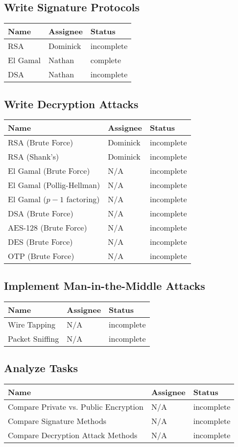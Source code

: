 \documentclass[12pt]{report}
\begin{document}
\subsection{Write Signature Protocols}
\begin{tabular}{l|l|l}
    Name & Assignee & Status \\ \hline
    RSA & Dominick & incomplete \\
    El Gamal & Nathan & complete \\
    DSA & Nathan & incomplete	 
\end{tabular}

\subsection{Write Decryption Attacks}
\begin{tabular}{l|l|l}
    Name & Assignee & Status \\ \hline
    RSA (Brute Force) & Dominick & incomplete \\
    RSA (Shank's) & Dominick & incomplete \\
    El Gamal (Brute Force) & N/A & incomplete \\
    El Gamal (Pollig-Hellman) & N/A & incomplete \\
    El Gamal ($p-1$ factoring) & N/A & incomplete \\
    DSA (Brute Force) & N/A & incomplete \\
    AES-128 (Brute Force) & N/A & incomplete \\
    DES (Brute Force) & N/A & incomplete \\
    OTP (Brute Force) & N/A & incomplete 
\end{tabular}

\subsection{Implement Man-in-the-Middle Attacks}
\begin{tabular}{l|l|l}
    Name & Assignee & Status \\ \hline
    Wire Tapping & N/A & incomplete \\
    Packet Sniffing & N/A & incomplete 
\end{tabular}

\subsection{Analyze Tasks}
\begin{tabular}{l|l|l}
    Name & Assignee & Status \\ \hline
    Compare Private vs. Public Encryption & N/A & incomplete \\
    Compare Signature Methods & N/A & incomplete \\
    Compare Decryption Attack Methods & N/A & incomplete
\end{tabular}
\end{document}
